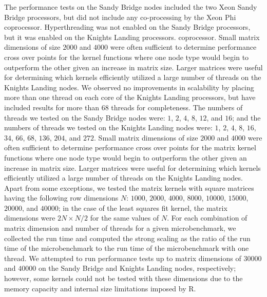 The performance tests on the Sandy Bridge nodes included the two Xeon Sandy
  Bridge processors, but did not include any co-processing by the Xeon Phi
  coprocessor. 
Hyperthreading was not enabled on the Sandy Bridge processors, but it was
  enabled on the Knights Landing processors.
  coprocessor.
Small matrix dimensions of size $2000$ and $4000$ were often sufficient to
  determine performance cross over points for the kernel functions where one
  node type would begin to outperform the other given an increase in matrix
  size.
Larger matrices were useful for determining which kernels efficiently utilized a
  large number of threads on the Knights Landing nodes.
We observed no improvements in scalability by placing more than one thread on
  each core of the Knights Landing processors, but have included results for
  more than 68 threads for completeness.
The numbers of threads we tested on the Sandy Bridge nodes were:
  $1$, $2$, $4$, $8$, $12$, and $16$; and the numbers of threads we tested on
  the Knights Landing nodes were:
  $1$, $2$, $4$, $8$, $16$, $34$, $66$, $68$, $136$, $204$, and $272$.
Small matrix dimensions of size $2000$ and $4000$ were often sufficient to
  determine performance cross over points for the matrix kernel functions where one
  node type would begin to outperform the other given an increase in matrix
  size.
Larger matrices were useful for determining which kernels efficiently utilized a
  large number of threads on the Knights Landing nodes.
Apart from some exceptions, we tested the matrix kernels with
  square matrices having the following row dimensions $N$:
  $1000$, $2000$, $4000$, $8000$, $10000$, $15000$, $20000$, and $40000$; in the
  case of the least squares fit kernel, the matrix dimensions were
  $2N \times N/2$ for the same values of $N$.
For each combination of matrix dimension and number of threads for a given
  microbenchmark, we collected the run time and computed the strong scaling as
  the ratio of the run time of the microbenchmark to the run time of the
  microbenchmark with one thread.
We attempted to run performance tests up to matrix dimensions of $30000$ and
  $40000$ on the Sandy Bridge and Knights Landing nodes, respectively; however,
  some kernels could not be tested with these dimensions due to the memory
  capacity and internal size limitations imposed by R.
